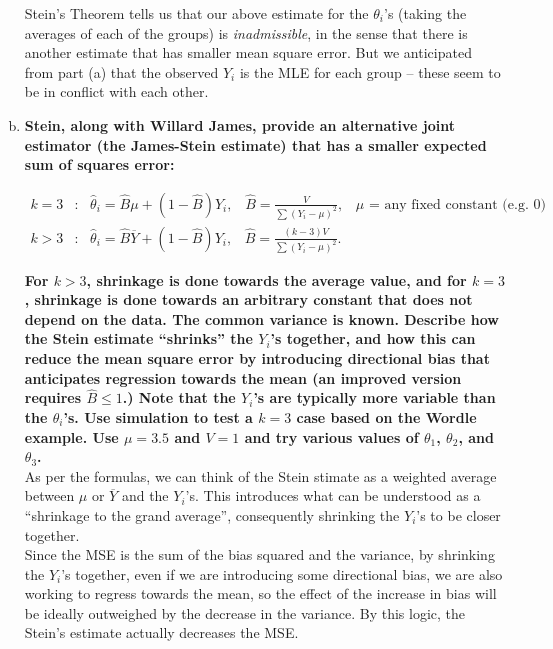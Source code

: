 \begin{enumerate}[a)]
    Stein's Theorem tells us that our above estimate for the $\theta_i$'s (taking the averages of each of the groups) is \textit{inadmissible}, in the sense that there is another estimate that has smaller mean square error. 
    But we anticipated from part (a) that the observed $Y_i$ is the MLE for each group -- these seem to be in conflict with each other. \\

    \item \textbf{Stein, along with Willard James, provide an alternative joint estimator (the James-Stein
    estimate) that has a smaller expected sum of squares error:}

    \begin{align*}
        k = 3&\colon \, \, \, \, \hat{\theta}_i = \hat{B} \mu + (1-\hat{B})Y_i, \,\, \, \, \, \hat{B} = \frac{V}{\sum (Y_i - \mu)^2}, \, \, \, \, \, \mu \text{ = any fixed constant (e.g. 0)} \\
        k > 3&\colon \, \, \, \, \hat{\theta}_i = \hat{B}\overline{Y}+ (1-\hat{B})Y_i, \, \, \, \, \,\hat{B} = \frac{(k-3)V}{\sum (Y_i - \mu)^2}.
    \end{align*}

    \textbf{For $k > 3$, shrinkage is done towards the average value, and for $k=3$, shrinkage is done towards an arbitrary constant that does not depend on the data. The common variance is known.
    Describe how the Stein estimate ``shrinks'' the $Y_i$'s together, and how this can reduce the mean square error by introducing directional bias that anticipates regression towards the mean (an improved version requires $\hat{B} \leq 1$.)
    Note that the $Y_i$'s are typically more variable than the $\theta_i$'s. Use simulation to test a $k=3$ case based on the Wordle example. Use $\mu = 3.5$ and $V=1$ and try various values of  $\theta_1$, $\theta_2$, and $\theta_3$.} \\

    As per the formulas, we can think of the Stein stimate as a weighted average between $\mu$ or $\overline{Y}$ and the $Y_i$'s. This introduces
    what can be understood as a ``shrinkage to the grand average'', consequently shrinking the $Y_i$'s to be closer together. \\
    
    Since the MSE is the sum of the bias squared and the variance, by shrinking the $Y_i$'s together, even if we are introducing some directional bias, we are also working to regress towards the mean, 
    so the effect of the increase in bias will be ideally outweighed by the decrease in the variance. By this logic, the Stein's estimate actually decreases the MSE. \\


\end{enumerate}
